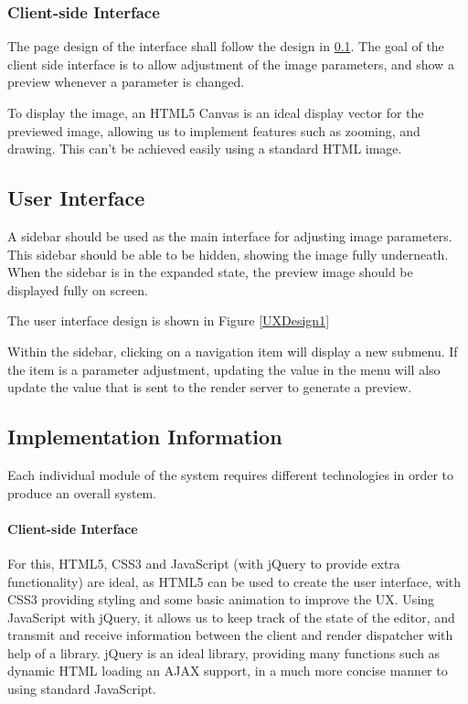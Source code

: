 \documentclass[12pt,a4paper]{article}
\begin{document}
\subsubsection{Client-side Interface}
  The page design of the interface shall follow the design in \ref{UserInterface}.
  The goal of the client side interface is to allow adjustment of the image parameters, and show a preview whenever a parameter is changed.

  To display the image, an HTML5 Canvas is an ideal display vector for the previewed image, allowing us to implement features such as zooming, and drawing. This can't be achieved easily using a standard HTML image.

\subsection{User Interface}\label{UserInterface}
  A sidebar should be used as the main interface for adjusting image parameters.
  This sidebar should be able to be hidden, showing the image fully underneath.
  When the sidebar is in the expanded state, the preview image should be displayed
  fully on screen.

  The user interface design is shown in Figure \ref{UXDesign1}

  Within the sidebar, clicking on a navigation item will display a new submenu.
  If the item is a parameter adjustment, updating the value in the menu will also update the value that is sent to the render server to generate a preview.
%

\subsection{Implementation Information}
Each individual module of the system requires different technologies in order to
produce an overall system.

\paragraph{Client-side Interface}
For this, HTML5, CSS3 and JavaScript (with jQuery to provide extra functionality)
are ideal, as HTML5 can be used to create the user interface, with CSS3 providing styling
and some basic animation to improve the UX. Using JavaScript with jQuery, it allows us to keep track of the state of the editor, and transmit and receive information between the client and render dispatcher with help of a library. jQuery is an ideal library, providing many functions such as dynamic HTML loading an AJAX support, in a much more concise manner to using standard JavaScript.
\end{document}
